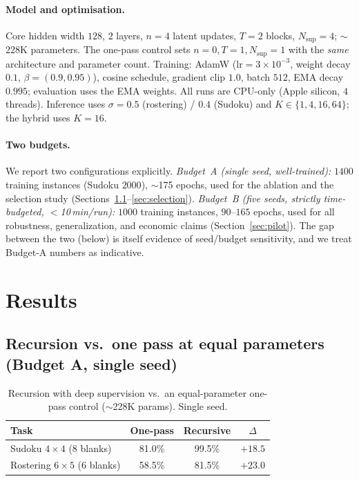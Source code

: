\documentclass{article}
\begin{document}
\paragraph{Model and optimisation.} Core hidden width $128$, $2$ layers,
$n{=}4$ latent updates, $T{=}2$ blocks, $N_{\mathrm{sup}}{=}4$; $\sim$228K
parameters. The one-pass control sets $n{=}0, T{=}1, N_{\mathrm{sup}}{=}1$ with the
\emph{same} architecture and parameter count. Training: AdamW
($\mathrm{lr}=3\!\times\!10^{-3}$, weight decay $0.1$, $\beta=(0.9,0.95)$), cosine
schedule, gradient clip $1.0$, batch $512$, EMA decay $0.995$; evaluation uses the
EMA weights. All runs are CPU-only (Apple silicon, $4$ threads). Inference uses
$\sigma{=}0.5$ (rostering) / $0.4$ (Sudoku) and $K\in\{1,4,16,64\}$; the hybrid
uses $K{=}16$.

\paragraph{Two budgets.} We report two configurations explicitly.
\emph{Budget~A (single seed, well-trained):} $1400$ training instances (Sudoku
$2000$), $\sim$175 epochs, used for the ablation and the selection study
(Sections~\ref{sec:ablation}--\ref{sec:selection}). \emph{Budget~B (five seeds,
strictly time-budgeted, $<$10\,min/run):} $1000$ training instances, $90$--$165$
epochs, used for all robustness, generalization, and economic claims
(Section~\ref{sec:pilot}). The gap between the two (below) is itself evidence of
seed/budget sensitivity, and we treat Budget-A numbers as indicative.

\section{Results}

\subsection{Recursion vs.\ one pass at equal parameters (Budget A, single seed)}
\label{sec:ablation}

\begin{table}[h]
\centering
\caption{Recursion with deep supervision vs.\ an equal-parameter one-pass control
($\sim$228K params). Single seed.}
\label{tab:ablation}
\begin{tabular}{lccc}
\toprule
Task & One-pass & Recursive & $\Delta$ \\
\midrule
Sudoku $4\times4$ (8 blanks) & 81.0\% & 99.5\% & $+18.5$ \\
Rostering $6\times5$ (6 blanks) & 58.5\% & 81.5\% & $+23.0$ \\
\bottomrule
\end{tabular}
\end{table}
\end{document}
